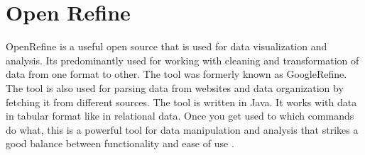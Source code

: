 \section{Open Refine}

OpenRefine is a useful open source that is used for data visualization and analysis. 
Its predominantly used for working with cleaning and transformation of data from one format to other.
The tool was formerly known as GoogleRefine. The tool is also used for parsing data from websites and data organization
by fetching it from different sources. The tool is written in Java. It works with data in tabular format like in relational data.
Once you get used to which commands do what, this is a powerful tool for data manipulation and analysis
that strikes a good balance between functionality and ease of use \cite{hid-sp18-417-openrefine}.

